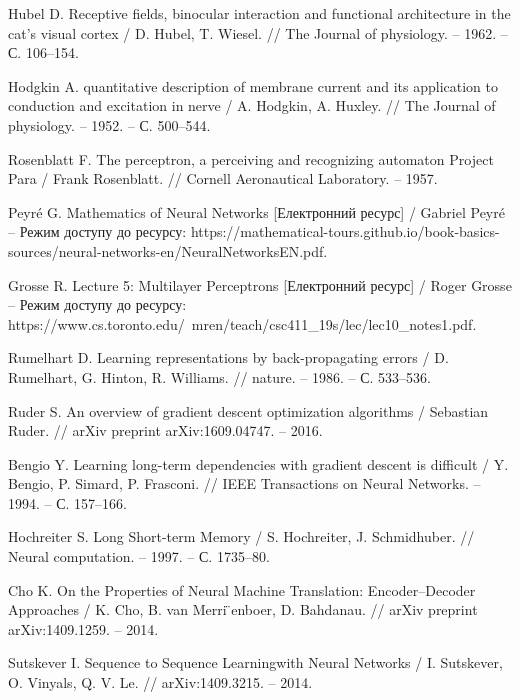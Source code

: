 \renewcommand\bibname{ПЕРЕЛІК ДЖЕРЕЛ ПОСИЛАННЯ}
\begin{thebibliography}{9}
    Hubel D. Receptive fields, binocular interaction and functional architecture in the cat’s visual cortex / D. Hubel, T. Wiesel. // The Journal of physiology. – 1962. – С. 106–154.

    Hodgkin A. quantitative description of membrane current and its application to conduction and excitation in nerve / A. Hodgkin, A. Huxley. // The Journal of physiology. – 1952. – С. 500–544.

    Rosenblatt F. The perceptron, a perceiving and recognizing automaton Project Para / Frank Rosenblatt. // Cornell Aeronautical Laboratory. – 1957.

    Peyré G. Mathematics of Neural Networks [Електронний ресурс] / Gabriel Peyré – Режим доступу до ресурсу: https://mathematical-tours.github.io/book-basics-sources/neural-networks-en/NeuralNetworksEN.pdf.

    Grosse R. Lecture 5: Multilayer Perceptrons [Електронний ресурс] / Roger Grosse – Режим доступу до ресурсу: https://www.cs.toronto.edu/~mren/teach/csc411\_19s/lec/lec10\_notes1.pdf.

    Rumelhart D. Learning representations by back-propagating errors / D. Rumelhart, G. Hinton, R. Williams. // nature. – 1986. – С. 533–536.

    Ruder S. An overview of gradient descent optimization algorithms / Sebastian Ruder. // arXiv preprint arXiv:1609.04747. – 2016.

    Bengio Y. Learning long-term dependencies with gradient descent is difficult / Y. Bengio, P. Simard, P. Frasconi. // IEEE Transactions on Neural Networks. – 1994. – С. 157–166.

    Hochreiter S. Long Short-term Memory / S. Hochreiter, J. Schmidhuber. // Neural computation. – 1997. – С. 1735–80.

    Cho K. On the Properties of Neural Machine Translation: Encoder–Decoder Approaches / K. Cho, B. van Merri ̈enboer, D. Bahdanau. // arXiv preprint arXiv:1409.1259. – 2014.

    Sutskever I. Sequence to Sequence Learningwith Neural Networks / I. Sutskever, O. Vinyals, Q. V. Le. // arXiv:1409.3215. – 2014.


\end{thebibliography}
